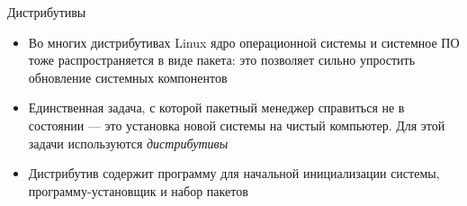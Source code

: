 \documentclass{beamer}
\begin{document}
\begin{frame}{Дистрибутивы}
	\begin{itemize}
		\item{Во многих дистрибутивах Linux ядро операционной системы и системное ПО тоже распространяется в виде пакета: это позволяет сильно упростить обновление системных компонентов}\pause
		\item{Единственная задача, с которой пакетный менеджер справиться не в состоянии --- это установка новой системы на чистый компьютер. Для этой задачи используются \emph{дистрибутивы}}\pause
		\item{Дистрибутив содержит программу для начальной инициализации системы, программу-установщик и набор пакетов}
	\end{itemize}
\end{frame}
\end{document}
